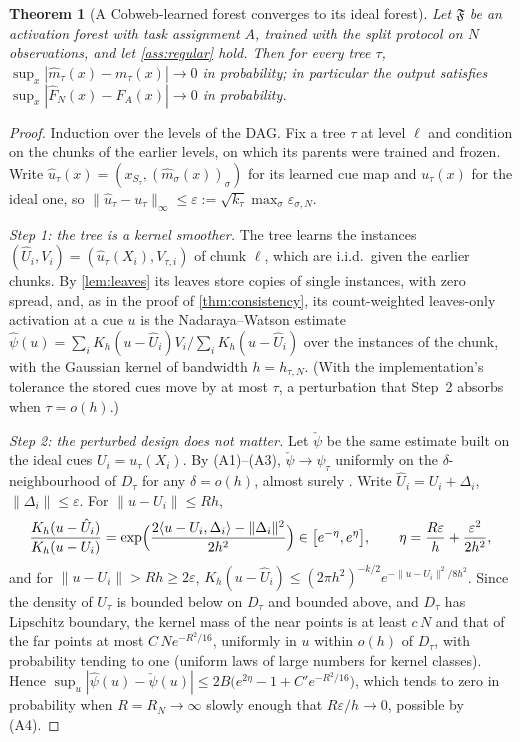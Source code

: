 \documentclass[11pt]{article}
\newtheorem{theorem}{Theorem}
\theoremstyle{definition}
\theoremstyle{remark}
\newcommand{\F}{\mathfrak{F}}
\begin{document}
\begin{theorem}[A Cobweb-learned forest converges to its ideal forest]\label{thm:ideal}
Let $\F$ be an activation forest with task assignment $A$, trained with the split
protocol on $N$ observations, and let \cref{ass:regular} hold.  Then for every tree
$\tau$, $\sup_x|\hat m_\tau(x)-m_\tau(x)|\to0$ in probability; in particular the output
satisfies $\sup_x|\hat F_N(x)-F_A(x)|\to0$ in probability.
\end{theorem}
\begin{proof}
Induction over the levels of the DAG.  Fix a tree $\tau$ at level $\ell$ and condition on
the chunks of the earlier levels, on which its parents were trained and frozen.  Write
$\hat u_\tau(x)=(x_{S_\tau},(\hat m_\sigma(x))_\sigma)$ for its learned cue map and
$u_\tau(x)$ for the ideal one, so $\|\hat u_\tau-u_\tau\|_\infty\le\varepsilon:=
\sqrt{k_\tau}\max_\sigma\varepsilon_{\sigma,N}$.

\emph{Step 1: the tree is a kernel smoother.}  The tree learns the instances
$(\hat U_i,V_i)=(\hat u_\tau(X_i),V_{\tau,i})$ of chunk $\ell$, which are i.i.d.\ given
the earlier chunks.  By \cref{lem:leaves} its leaves store copies of single instances,
with zero spread, and, as in the proof of \cref{thm:consistency}, its count-weighted
leaves-only activation at a cue $u$ is the Nadaraya--Watson estimate
$\hat\psi(u)=\sum_iK_h(u-\hat U_i)V_i/\sum_iK_h(u-\hat U_i)$ over the instances of the
chunk, with the Gaussian kernel of bandwidth $h=h_{\tau,N}$.  (With the implementation's
tolerance the stored cues move by at most $\tau$, a perturbation that Step~2 absorbs
when $\tau=o(h)$.)

\emph{Step 2: the perturbed design does not matter.}  Let $\check\psi$ be the same
estimate built on the ideal cues $U_i=u_\tau(X_i)$.  By (A1)--(A3), $\check\psi\to\psi_\tau$
uniformly on the $\delta$-neighbourhood of $D_\tau$ for any $\delta=o(h)$, almost surely
\citep{devroye1978,mack1982}.  Write $\hat U_i=U_i+\Delta_i$, $\|\Delta_i\|\le\varepsilon$.
For $\|u-U_i\|\le Rh$,
\[
  \frac{K_h(u-\hat U_i)}{K_h(u-U_i)}=\exp\Bigl(\frac{2\langle u-U_i,\Delta_i\rangle-\|\Delta_i\|^2}{2h^2}\Bigr)
  \in\bigl[e^{-\eta},e^{\eta}\bigr],\qquad \eta=\frac{R\varepsilon}{h}+\frac{\varepsilon^2}{2h^2},
\]
and for $\|u-U_i\|>Rh\ge2\varepsilon$, $K_h(u-\hat U_i)\le(2\pi h^2)^{-k/2}
e^{-\|u-U_i\|^2/8h^2}$.  Since the density of $U_\tau$ is bounded below on $D_\tau$ and
bounded above, and $D_\tau$ has Lipschitz boundary, the kernel mass of the near points
is at least $c\,N$ and that of the far points at most $C\,Ne^{-R^2/16}$, uniformly in $u$
within $o(h)$ of $D_\tau$, with probability tending to one (uniform laws of large numbers
for kernel classes).
Hence $\sup_u|\hat\psi(u)-\check\psi(u)|\le2B\bigl(e^{2\eta}-1+C'e^{-R^2/16}\bigr)$, which
tends to zero in probability when $R=R_N\to\infty$ slowly enough that
$R\varepsilon/h\to0$, possible by (A4).


\end{proof}
\end{document}
